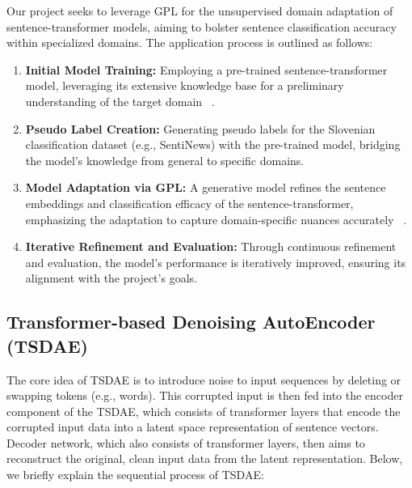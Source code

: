 \documentclass[fleqn,moreauthors,10pt]{ds_report}
\begin{document}
Our project seeks to leverage GPL for the unsupervised domain adaptation of sentence-transformer models, aiming to bolster sentence classification accuracy within specialized domains. The application process is outlined as follows:
\begin{enumerate}
    \item \textbf{Initial Model Training:} Employing a pre-trained sent\-ence-transformer model, leveraging its extensive knowledge base for a preliminary understanding of the target domain ~\cite{reimers2019sentence}.
    
    \item \textbf{Pseudo Label Creation:} Generating pseudo labels for the Slovenian classification dataset (e.g., SentiNews) with the pre-trained model, bridging the model's knowledge from general to specific domains.

    \item \textbf{Model Adaptation via GPL:} A generative model refines the sentence embeddings and classification efficacy of the sentence-transformer, emphasizing the adaptation to capture domain-specific nuances accurately ~\cite{wang-etal-2022-gpl}.

    \item \textbf{Iterative Refinement and Evaluation:} Through continuous refinement and evaluation, the model's performance is iteratively improved, ensuring its alignment with the project's goals.
\end{enumerate}



\subsection*{Transformer-based Denoising AutoEncoder (TSDAE)}

The core idea of TSDAE is to introduce noise to input sequences by deleting or swapping tokens (e.g., words). This corrupted input is then fed into the encoder component of the TSDAE, which consists of transformer layers that encode the corrupted input data into a latent space representation of sentence vectors. Decoder network, which also consists of transformer layers, then aims to reconstruct the original, clean input data from the latent representation. Below, we briefly explain the sequential process of TSDAE:
\end{document}

